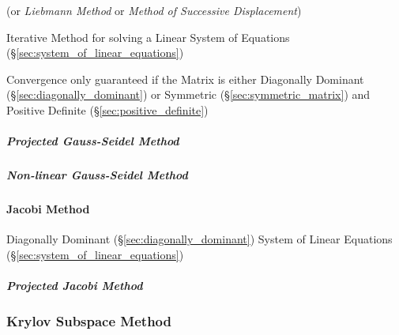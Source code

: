 (or \emph{Liebmann Method} or \emph{Method of Successive
  Displacement})

Iterative Method for solving a Linear System of Equations
(\S\ref{sec:system_of_linear_equations})

Convergence only guaranteed if the Matrix is either Diagonally
Dominant (\S\ref{sec:diagonally_dominant}) or Symmetric
(\S\ref{sec:symmetric_matrix}) and Positive Definite
(\S\ref{sec:positive_definite})



\subparagraph{Projected Gauss-Seidel Method}\hfill
\label{sec:projected_gauss_seidel}

\subparagraph{Non-linear Gauss-Seidel Method}
\label{sec:nonlinear_gauss_seidel}



\paragraph{Jacobi Method}\label{sec:jacobi_method}\hfill

Diagonally Dominant (\S\ref{sec:diagonally_dominant}) System of Linear
Equations (\S\ref{sec:system_of_linear_equations})



\subparagraph{Projected Jacobi Method}
\label{sec:projected_jacobi_method}



\subsubsection{Krylov Subspace Method}\label{sec:krylov_subspace_method}
